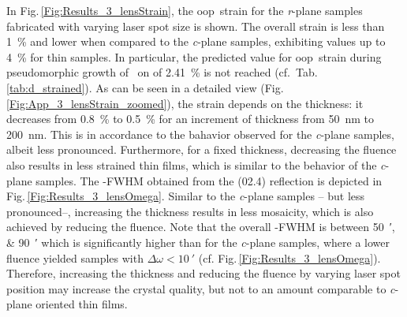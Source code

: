 In Fig.\,\ref{Fig:Results_3_lensStrain}, the \gls{oop}\ strain for the \textit{r}-plane samples fabricated with varying laser spot size is shown.
The overall strain is less than \qty{1}{\percent} and lower when compared to the \textit{c}-plane samples, exhibiting values up to \qty{4}{\percent} for thin samples.
In particular, the predicted value for \gls{oop}\ strain during pseudomorphic growth of \cro\ on  of \qty{2.41}{\percent} is not reached (cf.\ Tab.\,\ref{tab:d_strained}).
As can be seen in a detailed view (Fig.\,\ref{Fig:App_3_lensStrain_zoomed}), the strain depends on the thickness:
it decreases from \qty{0.8}{\percent} to \qty{0.5}{\percent} for an increment of thickness from \qty{50}{\nm} to \qty{200}{\nm}.
This is in accordance to the bahavior observed for the \textit{c}-plane samples, albeit less pronounced.
Furthermore, for a fixed thickness, decreasing the fluence also results in less strained thin films, which is similar to the behavior of the \textit{c}-plane samples.
The \textomega-FWHM obtained from the (02.4) reflection is depicted in Fig.\,\ref{Fig:Results_3_lensOmega}.
Similar to the \textit{c}-plane samples -- but less pronounced--, increasing the thickness results in less mosaicity, which is also achieved by reducing the fluence.
Note that the overall \textomega-FWHM is between \qtylist{50;90}{\arcminute} which is significantly higher than for the \textit{c}-plane samples, where a lower fluence yielded samples with $\Delta\omega<\qty{10}{\arcminute}$ (cf. Fig.\,\ref{Fig:Results_3_lensOmega}).
Therefore, increasing the thickness and reducing the fluence by varying laser spot position may increase the crystal quality, but not to an amount comparable to \textit{c}-plane oriented thin films.
